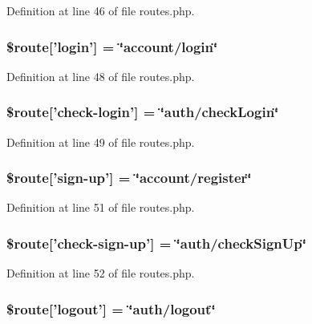 Definition at line 46 of file routes.\-php.

\subsubsection[{\$route}]{\setlength{\rightskip}{0pt plus 5cm}\$route['login'] = \char`\"{}account/login\char`\"{}}\label{routes_8php_ae498edf30300ac629d57d6f792269b5e}


Definition at line 48 of file routes.\-php.

\subsubsection[{\$route}]{\setlength{\rightskip}{0pt plus 5cm}\$route['check-\/login'] = \char`\"{}auth/check\-Login\char`\"{}}\label{routes_8php_a223aa064a349c5a0ee487832f915e81a}


Definition at line 49 of file routes.\-php.

\subsubsection[{\$route}]{\setlength{\rightskip}{0pt plus 5cm}\$route['sign-\/up'] = \char`\"{}account/register\char`\"{}}\label{routes_8php_a1a7cba54e5f132d593cd2e73f0b4aa21}


Definition at line 51 of file routes.\-php.

\subsubsection[{\$route}]{\setlength{\rightskip}{0pt plus 5cm}\$route['check-\/sign-\/up'] = \char`\"{}auth/check\-Sign\-Up\char`\"{}}\label{routes_8php_aed782d27d10fc156cc2bfd21da5f511b}


Definition at line 52 of file routes.\-php.

\subsubsection[{\$route}]{\setlength{\rightskip}{0pt plus 5cm}\$route['logout'] = \char`\"{}auth/logout\char`\"{}}\label{routes_8php_a1d3e833786c5b494a7e64bd90543ff54}


